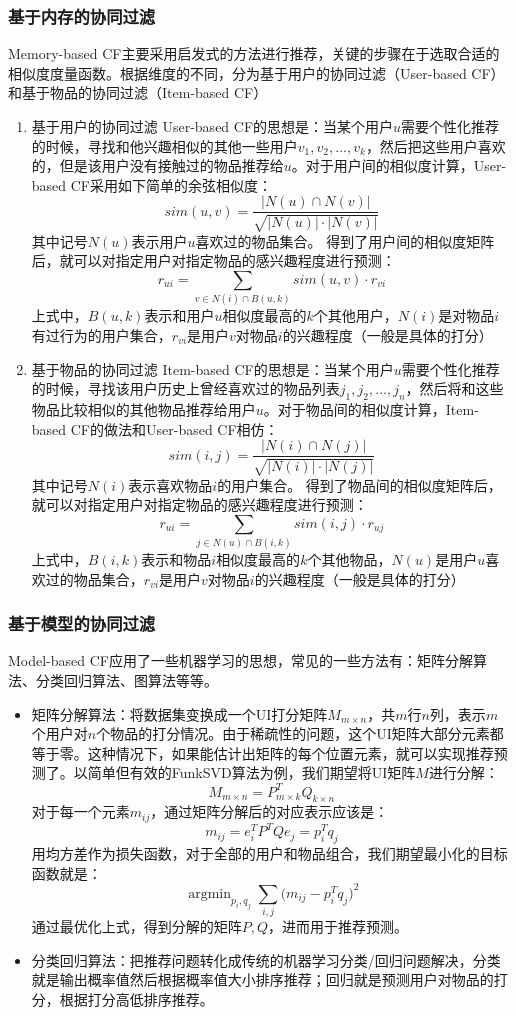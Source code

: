 \documentclass{article}
\begin{document}
		\subsubsection{基于内存的协同过滤}
		Memory-based CF主要采用启发式的方法进行推荐，关键的步骤在于选取合适的相似度度量函数。根据维度的不同，分为基于用户的协同过滤（User-based CF）和基于物品的协同过滤（Item-based CF）
		\begin{enumerate}
		\item 基于用户的协同过滤
		User-based CF的思想是：当某个用户$u$需要个性化推荐的时候，寻找和他兴趣相似的其他一些用户$v_1,v_2,\ldots,v_k$，然后把这些用户喜欢的，但是该用户没有接触过的物品推荐给$u$。对于用户间的相似度计算，User-based CF采用如下简单的余弦相似度：
		$$sim(u,v)=\frac{|N(u)\cap N(v)|}{\sqrt{|N(u)|\cdot|N(v)|}}$$
		其中记号$N(u)$表示用户$u$喜欢过的物品集合。
		得到了用户间的相似度矩阵后，就可以对指定用户对指定物品的感兴趣程度进行预测：
		$$r_{ui} = \sum\limits_{v\in N(i)\cap B(u,k)}sim(u,v)\cdot r_{vi}$$
		上式中，$B(u,k)$表示和用户$u$相似度最高的$k$个其他用户，$N(i)$是对物品$i$有过行为的用户集合，$r_{vi}$是用户$v$对物品$i$的兴趣程度（一般是具体的打分）
		\item 基于物品的协同过滤
		Item-based CF的思想是：当某个用户$u$需要个性化推荐的时候，寻找该用户历史上曾经喜欢过的物品列表$j_1,j_2,\ldots, j_n$，然后将和这些物品比较相似的其他物品推荐给用户$u$。对于物品间的相似度计算，Item-based CF的做法和User-based CF相仿：
		$$sim(i,j)=\frac{|N(i)\cap N(j)|}{\sqrt{|N(i)|\cdot|N(j)|}}$$
		其中记号$N(i)$表示喜欢物品$i$的用户集合。
		得到了物品间的相似度矩阵后，就可以对指定用户对指定物品的感兴趣程度进行预测：
		$$r_{ui} = \sum\limits_{j\in N(u)\cap B(i,k)}sim(i,j)\cdot r_{uj}$$
		上式中，$B(i,k)$表示和物品$i$相似度最高的$k$个其他物品，$N(u)$是用户$u$喜欢过的物品集合，$r_{vi}$是用户$v$对物品$i$的兴趣程度（一般是具体的打分）
		\end{enumerate}

		\subsubsection{基于模型的协同过滤}
		Model-based CF应用了一些机器学习的思想，常见的一些方法有：矩阵分解算法、分类回归算法、图算法等等。
		\begin{itemize}
		\item 矩阵分解算法：将数据集变换成一个UI打分矩阵$M_{m\times n}$，共$m$行$n$列，表示$m$个用户对$n$个物品的打分情况。由于稀疏性的问题，这个UI矩阵大部分元素都等于零。这种情况下，如果能估计出矩阵的每个位置元素，就可以实现推荐预测了。以简单但有效的FunkSVD算法为例，我们期望将UI矩阵$M$进行分解：
		$$M_{m\times n}=P^T_{m\times k}Q_{k\times n}$$
		对于每一个元素$m_{ij}$，通过矩阵分解后的对应表示应该是：
		$$m_{ij} = e_i^TP^TQe_j = p_i^Tq_j$$用均方差作为损失函数，对于全部的用户和物品组合，我们期望最小化的目标函数就是：
		$$\mathop{argmin}_{p_i,q_j}\sum_{i,j}\big(m_{ij}-p_i^Tq_j\big)^2$$
		通过最优化上式，得到分解的矩阵$P,Q$，进而用于推荐预测。
		\item 分类回归算法：把推荐问题转化成传统的机器学习分类/回归问题解决，分类就是输出概率值然后根据概率值大小排序推荐；回归就是预测用户对物品的打分，根据打分高低排序推荐。
		\end{itemize}
\end{document}
